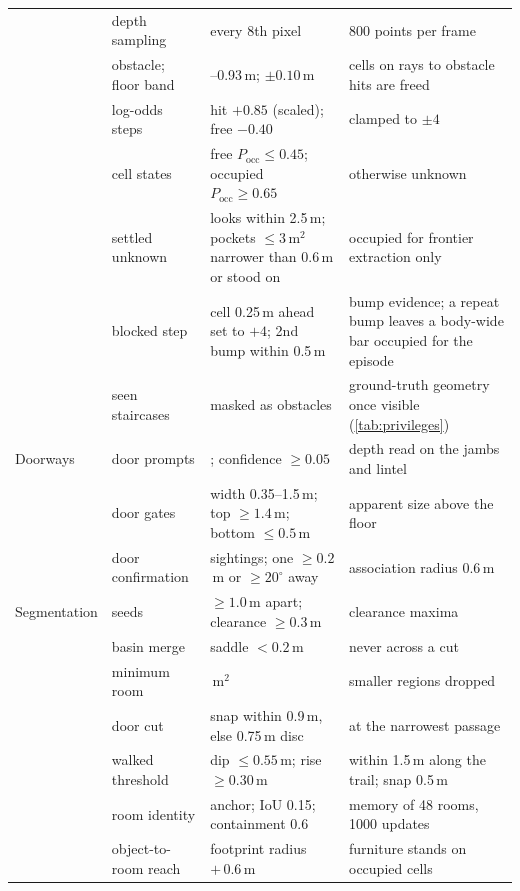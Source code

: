 \documentclass[10pt]{article}
\begin{document}
\begin{table}[p]
\begin{tabular}{@{}>{\raggedright\arraybackslash}p{1.9cm}>{\raggedright\arraybackslash}p{3.1cm}>{\raggedright\arraybackslash}p{3.8cm}>{\raggedright\arraybackslash}p{5.6cm}@{}}
 & depth sampling & every 8th pixel & 4{,}800 points per frame \\
 & obstacle; floor band & 0.15--0.93\,m; $\pm 0.10$\,m & cells on rays to obstacle hits are freed \\
 & log-odds steps & hit $+0.85$ (scaled); free $-0.40$ & clamped to $\pm 4$ \\
 & cell states & free $P_{\mathrm{occ}} \le 0.45$; occupied $P_{\mathrm{occ}} \ge 0.65$ & otherwise unknown \\
 & settled unknown & 2 looks within 2.5\,m; pockets $\le 3$\,m$^2$ narrower than 0.6\,m or stood on & occupied for frontier extraction only \\
 & blocked step & cell 0.25\,m ahead set to $+4$; 2nd bump within 0.5\,m & bump evidence; a repeat bump leaves a body-wide bar occupied for the episode \\
 & seen staircases & masked as obstacles & ground-truth geometry once visible (\cref{tab:privileges}) \\
\midrule
Doorways & door prompts & 4; confidence $\ge 0.05$ & depth read on the jambs and lintel \\
 & door gates & width 0.35--1.5\,m; top $\ge 1.4$\,m; bottom $\le 0.5$\,m & apparent size above the floor \\
 & door confirmation & 3 sightings; one $\ge 0.2$\,m or $\ge 20^\circ$ away & association radius 0.6\,m \\
\midrule
Segmen\-tation & seeds & $\ge 1.0$\,m apart; clearance $\ge 0.3$\,m & clearance maxima~\citep{vincent1991watersheds} \\
 & basin merge & saddle $< 0.2$\,m & never across a cut \\
 & minimum room & 0.5\,m$^2$ & smaller regions dropped \\
 & door cut & snap within 0.9\,m, else 0.75\,m disc & at the narrowest passage \\
 & walked threshold & dip $\le 0.55$\,m; rise $\ge 0.30$\,m & within 1.5\,m along the trail; snap 0.5\,m \\
 & room identity & anchor; IoU 0.15; containment 0.6 & memory of 48 rooms, 1000 updates \\
 & object-to-room reach & footprint radius $+\,0.6$\,m & furniture stands on occupied cells \\
\bottomrule
\end{tabular}
\end{table}
\end{document}
